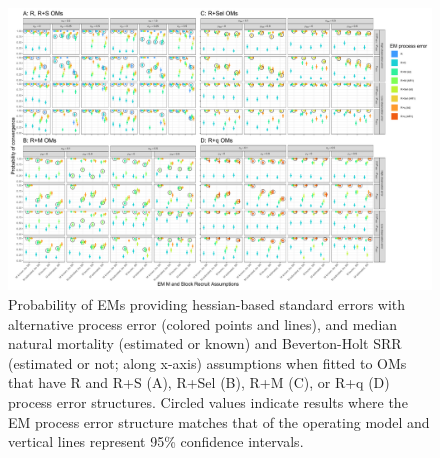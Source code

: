 \documentclass[
  12pt,
]{article}
\begin{document}
\begin{landscape}
\begin{figure}
\begin{center}
\includegraphics[width = 1.4\textwidth]{type_4_convergence_plots}
\end{center}
\caption{Probability of EMs providing hessian-based standard errors with alternative process error (colored points and lines), and median natural mortality (estimated or known) and Beverton-Holt SRR (estimated or not; along x-axis) assumptions when fitted to OMs that have R and R+S (A), R+Sel (B), R+M (C), or R+q (D) process error structures. Circled values indicate results where the EM process error structure matches that of the operating model and vertical lines represent 95\% confidence intervals.}\label{hessian_SE_convergence}
\end{figure}
\end{landscape}
\end{document}
